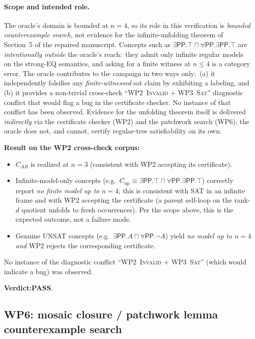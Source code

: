 \documentclass[11pt]{article}
\newcommand{\PP}{\mathsf{PP}}
\newcommand{\PASS}{\textcolor{black!70!green}{\textbf{PASS}}}
\begin{document}
\paragraph{Scope and intended role.}  The oracle's domain is
bounded at \(n=4\), so its role in this verification is
\emph{bounded counterexample search}, not evidence for the
infinite-unfolding theorem of Section~5 of the repaired
manuscript.  Concepts such as
\(\exists\PP.\top \sqcap \forall\PP.\exists\PP.\top\) are
\emph{intentionally outside} the oracle's reach:\ they admit only
infinite regular models on the strong-EQ semantics, and asking for
a finite witness at \(n\le 4\) is a category error.  The oracle
contributes to the campaign in two ways only:\ (a) it independently
falsifies any \emph{finite-witnessed} sat claim by exhibiting a
labeling, and (b) it provides a non-trivial cross-check
``WP2~\textsc{Invalid} \(+\) WP3~\textsc{Sat}'' diagnostic conflict
that would flag a bug in the certificate checker.  No instance of
that conflict has been observed.  Evidence for the unfolding
theorem itself is delivered \emph{indirectly} via the certificate
checker (WP2) and the patchwork search (WP6); the oracle does not,
and cannot, certify regular-tree satisfiability on its own.

\textbf{Result on the WP2 cross-check corpus:}
\begin{itemize}[leftmargin=2em]
  \item \(C_{AB}\) is realized at \(n=3\) (consistent with WP2
    accepting its certificate).
  \item Infinite-model-only concepts (e.g.\
    \(C_{\mathrm{up}} \equiv \exists\PP.\top \sqcap \forall\PP.\exists\PP.\top\))
    correctly report \emph{no finite model up to \(n=4\)}; this is
    consistent with SAT in an infinite frame and with WP2
    accepting the certificate (a parent self-loop on the
    rank-\(d\) quotient unfolds to fresh occurrences).  Per the
    scope above, this is the expected outcome, not a failure mode.
  \item Genuine UNSAT concepts (e.g.\
    \(\exists\PP.A \sqcap \forall\PP.\neg A\)) yield \emph{no
    model up to \(n=4\)} \emph{and} WP2 rejects the corresponding
    certificate.
\end{itemize}

No instance of the diagnostic conflict ``WP2~\textsc{Invalid} \(+\)
WP3~\textsc{Sat}'' (which would indicate a bug) was observed.

\textbf{Verdict:}\quad \PASS{}.

\subsection{WP6: mosaic closure / patchwork lemma counterexample search}
\end{document}
